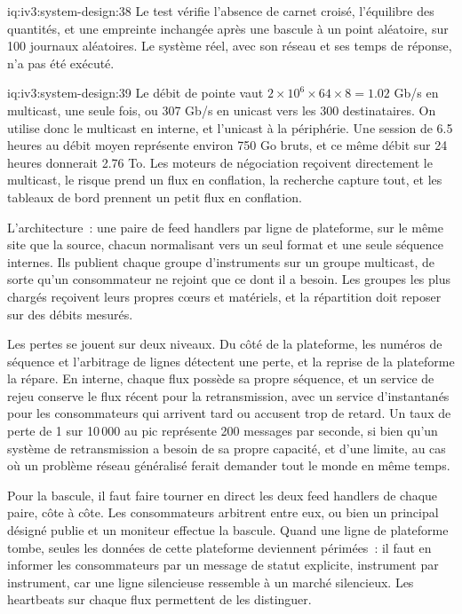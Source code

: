 \begin{solution}{iq:iv3:system-design:38}
Le test vérifie l'absence de carnet croisé, l'équilibre des quantités, et une empreinte inchangée après une bascule à un point aléatoire, sur 100 journaux aléatoires. Le système réel, avec son réseau et ses temps de réponse, n'a pas été exécuté.

\end{solution}

\begin{solution}{iq:iv3:system-design:39}
Le débit de pointe vaut $2 \times 10^6 \times 64 \times 8 = 1.02$ Gb/s en multicast, une seule fois, ou 307 Gb/s en unicast vers les 300 destinataires. On utilise donc le multicast en interne, et l'unicast à la périphérie. Une session de 6.5 heures au débit moyen représente environ 750 Go bruts, et ce même débit sur 24 heures donnerait 2.76 To. Les moteurs de négociation reçoivent directement le multicast, le risque prend un flux en conflation, la recherche capture tout, et les tableaux de bord prennent un petit flux en conflation.

L'architecture~: une paire de feed handlers par ligne de plateforme, sur le même site que la source, chacun normalisant vers un seul format et une seule séquence internes. Ils publient chaque groupe d'instruments sur un groupe multicast, de sorte qu'un consommateur ne rejoint que ce dont il a besoin. Les groupes les plus chargés reçoivent leurs propres cœurs et matériels, et la répartition doit reposer sur des débits mesurés.

Les pertes se jouent sur deux niveaux. Du côté de la plateforme, les numéros de séquence et l'arbitrage de lignes détectent une perte, et la reprise de la plateforme la répare. En interne, chaque flux possède sa propre séquence, et un service de rejeu conserve le flux récent pour la retransmission, avec un service d'instantanés pour les consommateurs qui arrivent tard ou accusent trop de retard. Un taux de perte de 1 sur 10\,000 au pic représente 200 messages par seconde, si bien qu'un système de retransmission a besoin de sa propre capacité, et d'une limite, au cas où un problème réseau généralisé ferait demander tout le monde en même temps.

Pour la bascule, il faut faire tourner en direct les deux feed handlers de chaque paire, côte à côte. Les consommateurs arbitrent entre eux, ou bien un principal désigné publie et un moniteur effectue la bascule. Quand une ligne de plateforme tombe, seules les données de cette plateforme deviennent périmées~: il faut en informer les consommateurs par un message de statut explicite, instrument par instrument, car une ligne silencieuse ressemble à un marché silencieux. Les heartbeats sur chaque flux permettent de les distinguer.


\end{solution}
